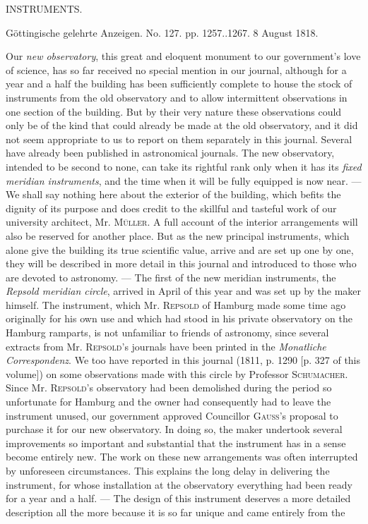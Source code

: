 \clearpage
{}
\begin{center}
\Large INSTRUMENTS.
\end{center}

\begin{center}
Göttingische gelehrte Anzeigen. No. 127. pp. 1257..1267. 8 August 1818.
\end{center}

\par\indent Our \emph{new observatory}, this great and eloquent monument to our government’s love of science, has so far received no special mention in our journal, although for a year and a half the building has been sufficiently complete to house the stock of instruments from the old observatory and to allow intermittent observations in one section of the building. But by their very nature these observations could only be of the kind that could already be made at the old observatory, and it did not seem appropriate to us to report on them separately in this journal. Several have already been published in astronomical journals. The new observatory, intended to be second to none, can take its rightful rank only when it has its \emph{fixed meridian instruments}, and the time when it will be fully equipped is now near. --- We shall say nothing here about the exterior of the building, which befits the dignity of its purpose and does credit to the skillful and tasteful work of our university architect, Mr. \textsc{Müller}. A full account of the interior arrangements will also be reserved for another place. But as the new principal instruments, which alone give the building its true scientific value, arrive and are set up one by one, they will be described in more detail in this journal and introduced to those who are devoted to astronomy. --- The first of the new meridian instruments, the \emph{Repsold meridian circle}, arrived in April of this year and was set up by the maker himself. The instrument, which Mr. \textsc{Repsold} of Hamburg made some time ago originally for his own use and which had stood in his private observatory on the Hamburg ramparts, is not unfamiliar to friends of astronomy, since several extracts from Mr. \textsc{Repsold}’s journals have been printed in the \textit{Monatliche Correspondenz}. We too have reported in this journal (1811, p. 1290 [p. 327 of this volume]) on some observations made with this circle by Professor \textsc{Schumacher}. Since Mr. \textsc{Repsold}’s observatory had been demolished during the period so unfortunate for Hamburg and the owner had consequently had to leave the instrument unused, our government approved Councillor \textsc{Gauss}’s proposal to purchase it for our new observatory. In doing so, the maker undertook several improvements so important and substantial that the instrument has in a sense become entirely new. The work on these new arrangements was often interrupted by unforeseen circumstances. This explains the long delay in delivering the instrument, for whose installation at the observatory everything had been ready for a year and a half. --- The design of this instrument deserves a more detailed description all the more because it is so far unique and came entirely from the 